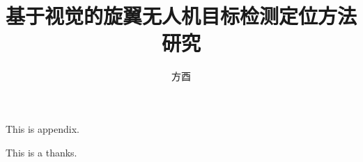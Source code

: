 \documentclass[twoside,UTF8]{nputhesis}
\title[Research on Vision-based Object Detection and Localization for Rotorcraft UAVs]{基于视觉的旋翼无人机目标检测定位方法研究}
\author[You Fang]{方酉}
\begin{document}
\makecover  %
\frontmatter


\tableofcontents 
\mainmatter  %


%














\backmatter



\Appendix
This is appendix.

\Thanks
This is a thanks.

\Work

\statement
\end{document}
